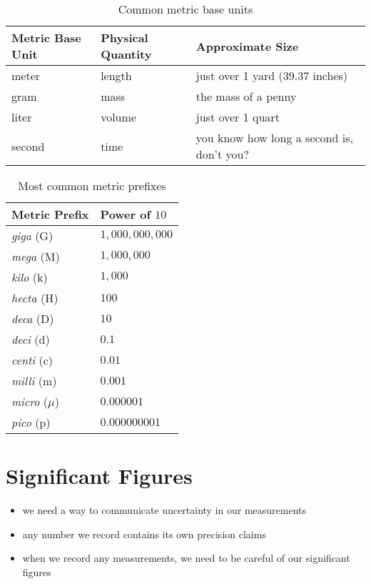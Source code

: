 \documentclass[11pt, oneside]{article}   	%
\begin{document}
\begin{table}
\centering
\begin{tabular}[hbpt]{|l | l| l|}
\hline
Metric Base Unit & Physical Quantity & Approximate Size \\
\hline
meter     & length    & just over 1 yard (39.37 inches) \\
gram      & mass     & the mass of a penny \\
liter         & volume & just over 1 quart \\
second   & time      & you know how long a second is, don't you? \\
\hline
\end{tabular}
\caption{Common metric base units}
\end{table}


\begin{table}
\centering
\begin{tabular}[hbpt]{|l|l|}
\hline
Metric Prefix & Power of $10$ \\
\hline
\emph{giga} (G)           & $ 1,000,000,000 $   \\
\emph{mega} (M)         & $ 1,000,000 $   \\
\emph{kilo} (k)              & $ 1,000 $   \\
\emph{hecta} (H)          & $ 100 $   \\
\emph{deca} (D)           & $ 10 $   \\
\emph{deci} (d)             & $ 0.1 $   \\
\emph{centi} (c)            & $ 0.01 $   \\
\emph{milli}  (m)           & $ 0.001 $  \\
\emph{micro} ($\mu$)  & $ 0.000001 $  \\
\emph{pico}  (p)           & $ 0.000000001 $  \\
\hline
\end{tabular}
\caption{Most common metric prefixes}
\end{table}



\section{Significant Figures}
\begin{itemize}
\item we need a way to communicate uncertainty in our measurements
\item any number we record contains its own precision claims
\item when we record any measurements, we need to be careful of our significant figures
\end{itemize}
\end{document}

